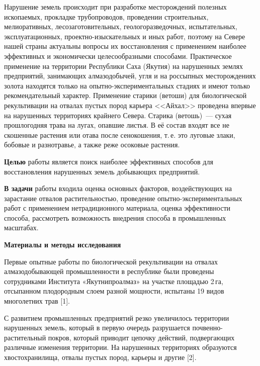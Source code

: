 
 



\makeProcTitleRazdel

Нарушение земель происходит при разработке месторождений полезных ископаемых, прокладке трубопроводов, проведении строительных, мелиоративных, лесозаготовительных, геологоразведочных, испытательных, эксплуатационных, проектно-изыскательных и иных работ, поэтому на Севере нашей страны актуальны вопросы их восстановления с применением наиболее эффективных и экономически целесообразными способами. Практическое применение на территории Республики Саха (Якутия) на нарушенных землях предприятий, занимающих алмазодобычей, угля и на россыпных месторождениях золота находятся только на опытно-экспериментальных стадиях и имеют только рекомендательный характер.  Применение старики (ветоши) для биологической рекультивации на отвалах пустых пород карьера <<Айхал>> проведена впервые на нарушенных территориях крайнего Севера. Старика (ветошь)~--- сухая прошлогодняя трава на лугах, опавшие листья. В её состав входят все не скошенные растения или отава после сенокошения, т.\,е. это луговые злаки, бобовые и разнотравье, а также реже осоковые растения.

\textbf{Целью} работы является поиск наиболее эффективных способов для восстановления нарушенных земель добывающих предприятий.

\textbf{В задачи} работы входила оценка основных факторов, воздействующих на зарастание отвалов растительностью, проведение опытно-экс\-пе\-ри\-мен\-таль\-ных работ с применением нетрадиционного материала, оценка эффективности способа, рассмотреть возможность внедрения способа в промышленных масштабах.

\textbf{Материалы и методы исследования}

Первые опытные работы по биологической рекультивации на отвалах алмазодобывающей промышленности в республике были проведены сотрудниками Института «Якутнипроалмаз» на участке площадью 2\,га, отсыпанном плодородным слоем разной мощности, испытаны 19 видов многолетних трав [1].

С развитием промышленных предприятий резко увеличилось территории нарушенных земель, который в первую очередь разрушается почвенно-растительный покров, который приводит цепочку действий, подвергающих различные изменения территории. На нарушенных территориях образуются хвостохранилища, отвалы пустых пород, карьеры и другие [2].

